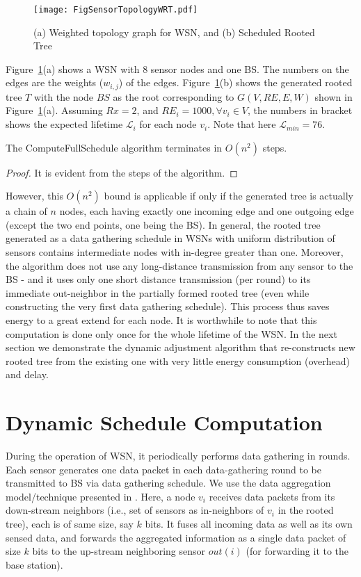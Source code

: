 \documentclass[10pt]{llncs}
\begin{document}
\begin{figure}[!ht]
\centerline{\texttt{[image: FigSensorTopologyWRT.pdf]}}
\caption{(a) Weighted topology graph for WSN, and (b) Scheduled Rooted Tree}
\label{fig:sensor:wrt}
\end{figure}

Figure~\ref{fig:sensor:wrt}(a) shows a WSN with $8$ sensor nodes and one BS. The numbers on the edges are the weights ($w_{i,j}$) of the edges. Figure~\ref{fig:sensor:wrt}(b) shows the generated rooted tree $T$ with the node $BS$ as the root corresponding to $G(V, RE, E, W)$ shown in Figure~\ref{fig:sensor:wrt}(a). Assuming $Rx = 2$, and $RE_i = 1000, \forall v_i \in V$, the numbers in bracket shows the expected lifetime $\mathcal{L}_i$ for each node $v_i$. Note that here $\mathcal{L}_{min} = 76$.

\begin{theorem}
The ComputeFullSchedule algorithm terminates in $O(n^2)$ steps.
\end{theorem}

\begin{proof}
It is evident from the steps of the algorithm.
\end{proof}

However, this $O(n^2)$ bound is applicable if only if the generated tree is actually a chain of $n$ nodes, each having exactly one incoming edge and one outgoing edge (except the two end points, one being the BS). In general, the rooted tree generated as a data gathering schedule in WSNs with uniform distribution of sensors contains intermediate nodes with in-degree greater than one. Moreover, the algorithm does not use any long-distance transmission from any sensor to the BS - and it uses only one short distance transmission (per round) to its immediate out-neighbor in the partially formed rooted tree (even while constructing the very first data gathering schedule). This process thus saves energy to a great extend for each node. It is worthwhile to note that this computation is done only once for the whole lifetime of the WSN. In the next section we demonstrate the dynamic adjustment algorithm that re-constructs new rooted tree from the existing one with very little energy consumption (overhead) and delay. 

\section{Dynamic Schedule Computation}

During the operation of WSN, it periodically performs data gathering in rounds. Each sensor generates one data packet in each data-gathering round to be transmitted to BS via data gathering schedule. We use the data aggregation model/technique presented in \cite{Lindsey02}. Here, a node $v_i$ receives data packets from its down-stream neighbors (i.e., set of sensors as in-neighbors of $v_i$ in the rooted tree), each is of same size, say $k$ bits. It fuses all incoming data as well as its own sensed data, and forwards the aggregated information as a single data packet of size $k$ bits to the up-stream neighboring sensor $out(i)$ (for forwarding it to the base station).
\end{document}
